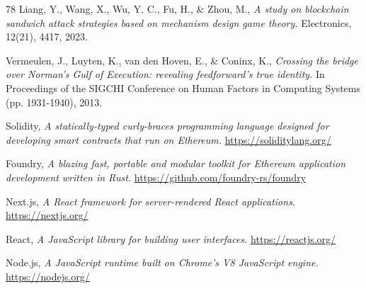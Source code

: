 \documentclass[preprint,12pt]{elsarticle}
\begin{document}
\begin{thebibliography}{78}
Liang, Y., Wang, X., Wu, Y. C., Fu, H., \& Zhou, M.,
\textit{A study on blockchain sandwich attack strategies based on mechanism design game theory.}
Electronics, 12(21), 4417, 2023.

Vermeulen, J., Luyten, K., van den Hoven, E., \& Coninx, K.,
\textit{Crossing the bridge over Norman's Gulf of Execution: revealing feedforward's true identity.}
In Proceedings of the SIGCHI Conference on Human Factors in Computing Systems (pp. 1931-1940), 2013.

Solidity,
\textit{A statically-typed curly-braces programming language designed for developing smart contracts that run on Ethereum.}
\url{https://soliditylang.org/}

Foundry,
\textit{A blazing fast, portable and modular toolkit for Ethereum application development written in Rust.}
\url{https://github.com/foundry-rs/foundry}

Next.js,
\textit{A React framework for server-rendered React applications.}
\url{https://nextjs.org/}

React,
\textit{A JavaScript library for building user interfaces.}
\url{https://reactjs.org/}

Node.js,
\textit{A JavaScript runtime built on Chrome's V8 JavaScript engine.}
\url{https://nodejs.org/}


\end{thebibliography}
\end{document}
